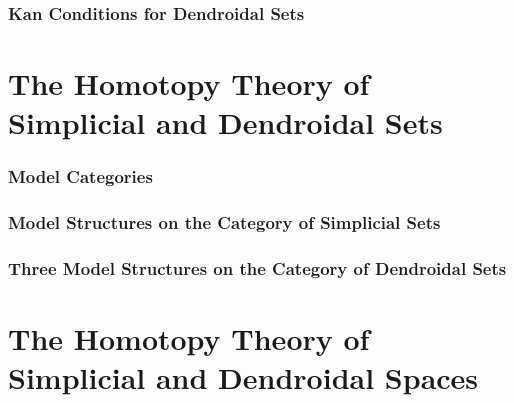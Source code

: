 \documentclass[11pt, a4paper]{article}
\begin{document}
\section{Kan Conditions for Dendroidal Sets}

\part{The Homotopy Theory of Simplicial and Dendroidal Sets}

\section{Model Categories}

\section{Model Structures on the Category of Simplicial Sets}

\section{Three Model Structures on the Category of Dendroidal Sets}

\part{The Homotopy Theory of Simplicial and Dendroidal Spaces}
\end{document}

